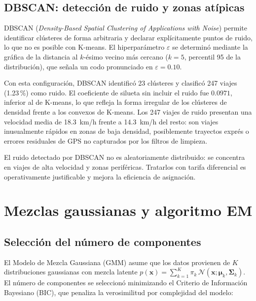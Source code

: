 \documentclass[12pt, a4paper]{article}
\begin{document}
\subsection{DBSCAN: detección de ruido y zonas atípicas}

DBSCAN (\emph{Density-Based Spatial Clustering of Applications with Noise}) permite identificar clústeres de forma arbitraria y declarar explícitamente puntos de ruido, lo que no es posible con K-means. El hiperparámetro $\varepsilon$ se determinó mediante la gráfica de la distancia al $k$-ésimo vecino más cercano ($k=5$, percentil 95 de la distribución), que señala un codo pronunciado en $\varepsilon = 0{.}10$.

Con esta configuración, DBSCAN identificó 23 clústeres y clasificó 247 viajes (1{.}23\,\%) como ruido. El coeficiente de silueta sin incluir el ruido fue $0{.}0971$, inferior al de K-means, lo que refleja la forma irregular de los clústeres de densidad frente a los convexos de K-means. Los 247 viajes de ruido presentan una velocidad media de 18{.}3~km/h frente a 14{.}3~km/h del resto: son viajes inusualmente rápidos en zonas de baja densidad, posiblemente trayectos exprés o errores residuales de GPS no capturados por los filtros de limpieza.

\begin{hallazgo}
El ruido detectado por DBSCAN no es aleatoriamente distribuido: se concentra en viajes de alta velocidad y zonas periféricas. Tratarlos con tarifa diferencial es operativamente justificable y mejora la eficiencia de asignación.
\end{hallazgo}

\section{Mezclas gaussianas y algoritmo EM}
\label{sec:gmm}

\subsection{Selección del número de componentes}

El Modelo de Mezcla Gaussiana (GMM) asume que los datos provienen de $K$ distribuciones gaussianas con mezcla latente $p(\mathbf{x}) = \sum_{k=1}^{K} \pi_k\,\mathcal{N}(\mathbf{x};\boldsymbol{\mu}_k,\boldsymbol{\Sigma}_k)$. El número de componentes se seleccionó minimizando el Criterio de Información Bayesiano (BIC), que penaliza la verosimilitud por complejidad del modelo:
\end{document}
